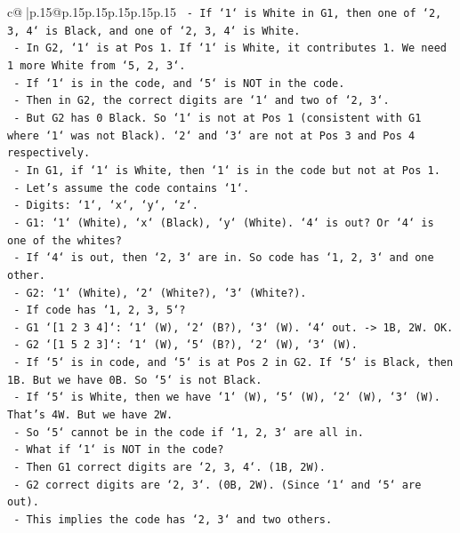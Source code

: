 \documentclass{article}
\begin{document}
{\begin{supertabular}{c@{$\;$}|p{.15\linewidth}@{}p{.15\linewidth}p{.15\linewidth}p{.15\linewidth}p{.15\linewidth}p{.15\linewidth}}
{{{\texttt{      {-} If `1` is White in G1, then one of `2, 3, 4` is Black, and one of `2, 3, 4` is White.} \\
\texttt{      {-} In G2, `1` is at Pos 1. If `1` is White, it contributes 1. We need 1 more White from `5, 2, 3`.} \\
\texttt{      {-} If `1` is in the code, and `5` is NOT in the code.} \\
\texttt{      {-} Then in G2, the correct digits are `1` and two of `2, 3`.} \\
\texttt{      {-} But G2 has 0 Black. So `1` is not at Pos 1 (consistent with G1 where `1` was not Black). `2` and `3` are not at Pos 3 and Pos 4 respectively.} \\
\texttt{      {-} In G1, if `1` is White, then `1` is in the code but not at Pos 1.} \\
\texttt{      {-} Let's assume the code contains `1`.} \\
\texttt{      {-} Digits: `1`, `x`, `y`, `z`.} \\
\texttt{      {-} G1: `1` (White), `x` (Black), `y` (White). `4` is out? Or `4` is one of the whites?} \\
\texttt{      {-} If `4` is out, then `2, 3` are in. So code has `1, 2, 3` and one other.} \\
\texttt{      {-} G2: `1` (White), `2` (White?), `3` (White?).} \\
\texttt{      {-} If code has `1, 2, 3, 5`?} \\
\texttt{        {-} G1 `{[}1 2 3 4{]}`: `1` (W), `2` (B?), `3` (W). `4` out. {-}> 1B, 2W. OK.} \\
\texttt{        {-} G2 `{[}1 5 2 3{]}`: `1` (W), `5` (B?), `2` (W), `3` (W).} \\
\texttt{          {-} If `5` is in code, and `5` is at Pos 2 in G2. If `5` is Black, then 1B. But we have 0B. So `5` is not Black.} \\
\texttt{          {-} If `5` is White, then we have `1` (W), `5` (W), `2` (W), `3` (W). That's 4W. But we have 2W.} \\
\texttt{          {-} So `5` cannot be in the code if `1, 2, 3` are all in.} \\
\texttt{      {-} What if `1` is NOT in the code?} \\
\texttt{        {-} Then G1 correct digits are `2, 3, 4`. (1B, 2W).} \\
\texttt{        {-} G2 correct digits are `2, 3`. (0B, 2W). (Since `1` and `5` are out).} \\
\texttt{        {-} This implies the code has `2, 3` and two others.} \\
}}}
\end{supertabular}}
\end{document}
